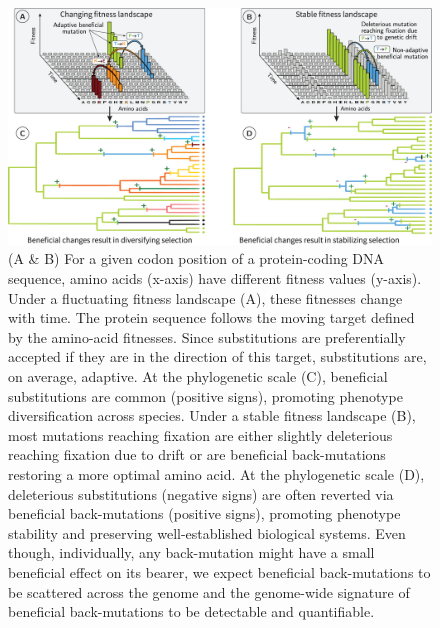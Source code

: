 \documentclass[9pt,twocolumn,twoside,lineno]{pnas-new}
\begin{document}
\begin{figure}[htb]
       \centering
       \includegraphics[width=17.8cm, page=1]{figure1}
       \caption{
              (A \& B) For a given codon position of a protein-coding DNA sequence, amino acids (x-axis) have different fitness values (y-axis).
              Under a fluctuating fitness landscape (A), these fitnesses change with time.
              The protein sequence follows the moving target defined by the amino-acid fitnesses. Since substitutions are preferentially accepted if they are in the direction of this target, substitutions are, on average, adaptive.
              At the phylogenetic scale (C), beneficial substitutions are common (positive signs), promoting phenotype diversification across species.
              Under a stable fitness landscape (B), most mutations reaching fixation are either slightly deleterious reaching fixation due to drift or are beneficial back-mutations restoring a more optimal amino acid.
              At the phylogenetic scale (D), deleterious substitutions (negative signs) are often reverted via beneficial back-mutations (positive signs), promoting phenotype stability and preserving well-established biological systems.
              Even though, individually, any back-mutation might have a small beneficial effect on its bearer, we expect beneficial back-mutations to be scattered across the genome and the genome-wide signature of beneficial back-mutations to be detectable and quantifiable.}
       \label{fig:fitness-landscape}
\end{figure}
\end{document}

